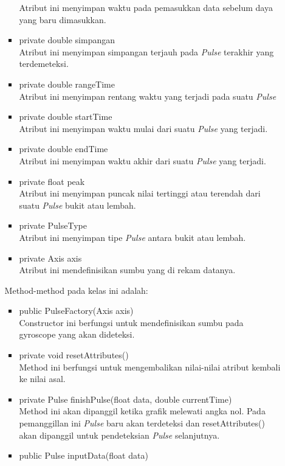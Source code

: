 \begin{itemize}
\begin{itemize}
\begin{itemize}
            Atribut ini menyimpan waktu pada pemasukkan data sebelum daya yang baru dimasukkan.
            \item private double simpangan\\
            Atribut ini menyimpan simpangan terjauh pada \textit{Pulse} terakhir yang terdemeteksi.
            \item private double rangeTime\\
            Atribut ini menyimpan rentang waktu yang terjadi pada suatu \textit{Pulse}
            \item private double startTime\\
            Atribut ini menyimpan waktu mulai dari suatu \textit{Pulse} yang terjadi.
            \item private double endTime\\
            Atribut ini menyimpan waktu akhir dari suatu \textit{Pulse} yang terjadi.
            \item private float peak\\
            Atribut ini menyimpan puncak nilai tertinggi atau terendah dari suatu \textit{Pulse} bukit atau lembah.
            \item private PulseType\\
            Atribut ini menyimpan tipe \textit{Pulse} antara bukit atau lembah.
            \item private Axis axis\\
            Atribut ini mendefinisikan sumbu yang di rekam datanya.    
        \end{itemize}
        Method-method pada kelas ini adalah:
        \begin{itemize}
            \item public PulseFactory(Axis axis)\\
            Constructor ini berfungsi untuk mendefinisikan sumbu pada gyroscope yang akan dideteksi.
            \item private void resetAttributes()\\
            Method ini berfungsi untuk mengembalikan nilai-nilai atribut kembali ke nilai asal.
            \item private Pulse finishPulse(float data, double currentTime)\\
            Method ini akan dipanggil ketika grafik melewati angka nol. Pada pemanggillan ini \textit{Pulse} baru akan terdeteksi dan resetAttributes() akan dipanggil untuk pendeteksian \textit{Pulse} selanjutnya.
            \item public Pulse inputData(float data)\\

\end{itemize}
\end{itemize}
\end{itemize}
